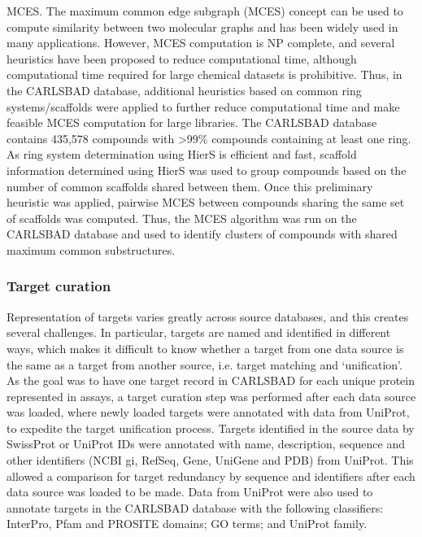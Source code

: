 MCES. The maximum common edge subgraph (MCES) concept\cite{Raymond2002-ep} can be used to compute similarity between two molecular graphs and has been widely used in many applications\cite{Stahl2005-bl,Sheridan2006-nx,Gardiner2007-ur,Bocker2008-uh,Hariharan2011-qx,Bostrom2012-fb}. However, MCES computation is NP complete, and several heuristics have been proposed to reduce computational time, although computational time required for large chemical datasets is prohibitive. Thus, in the CARLSBAD database, additional heuristics based on common ring systems/scaffolds were applied to further reduce computational time and make feasible MCES computation for large libraries. The CARLSBAD database contains 435,578 compounds with \textgreater99\% compounds containing at least one ring. As ring system determination using HierS is efficient and fast, scaffold information determined using HierS was used to group compounds based on the number of common scaffolds shared between them. Once this preliminary heuristic was applied, pairwise MCES between compounds sharing the same set of scaffolds was computed. Thus, the MCES algorithm was run on the CARLSBAD database and used to identify clusters of compounds with shared maximum common substructures.

\subsubsection{Target curation}

Representation of targets varies greatly across source databases, and this creates several challenges. In particular, targets are named and identified in different ways, which makes it difficult to know whether a target from one data source is the same as a target from another source, i.e. target matching and ‘unification’. As the goal was to have one target record in CARLSBAD for each unique protein represented in assays, a target curation step was performed after each data source was loaded, where newly loaded targets were annotated with data from UniProt\cite{UniProt_Consortium2018-kq}, to expedite the target unification process. Targets identified in the source data by SwissProt or UniProt IDs were annotated with name, description, sequence and other identifiers (NCBI gi, RefSeq, Gene, UniGene and PDB) from UniProt. This allowed a comparison for target redundancy by sequence and identifiers after each data source was loaded to be made. Data from UniProt were also used to annotate targets in the CARLSBAD database with the following classifiers: InterPro, Pfam and PROSITE domains; GO terms; and UniProt family.

